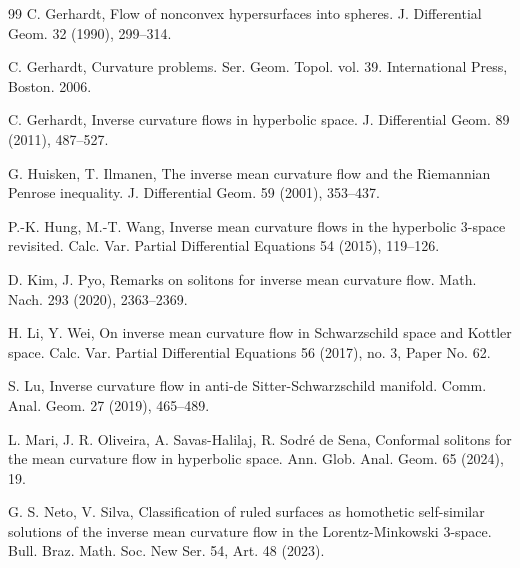 \documentclass[12pt]{amsart}
\theoremstyle{plain}
\theoremstyle{definition}
\begin{document}
\begin{thebibliography}{99}
 C. Gerhardt, Flow of nonconvex hypersurfaces into spheres. J.   Differential Geom. 32 (1990), 299--314.

 C. Gerhardt, Curvature problems. Ser. Geom. Topol. vol. 39. International Press, Boston. 2006.

 C. Gerhardt, Inverse curvature flows in hyperbolic space. J. Differential Geom. 89 (2011), 487--527.



 

 G. Huisken, T. Ilmanen, The inverse mean curvature flow and the Riemannian Penrose inequality. J.    Differential Geom. 59 (2001), 353--437.

 P.-K. Hung, M.-T. Wang, Inverse mean curvature flows in the hyperbolic 3-space revisited. Calc. Var. Partial Differential Equations 54 (2015),   119--126.

 D. Kim, J. Pyo, Remarks on solitons for inverse mean curvature flow. Math. Nach. 293 (2020), 2363--2369.

 H. Li, Y.  Wei, On inverse mean curvature flow in Schwarzschild space and Kottler space. Calc. Var. Partial Differential Equations 56 (2017), no. 3, Paper No. 62.




 
  S. Lu, Inverse curvature flow in anti-de Sitter-Schwarzschild manifold. Comm. Anal. Geom. 27 (2019), 465--489. 


  L. Mari, J. R. Oliveira, A. Savas-Halilaj, R. Sodr\'e de Sena, Conformal solitons for the mean curvature flow in hyperbolic space. Ann. Glob. Anal. Geom. 65 (2024), 19. 
 
  G. S. Neto, V. Silva,   Classification of ruled surfaces as homothetic self-similar solutions of the inverse mean curvature flow in the Lorentz-Minkowski 3-space. Bull. Braz. Math. Soc. New Ser. 54, Art. 48 (2023).
 

\end{thebibliography}
\end{document}
